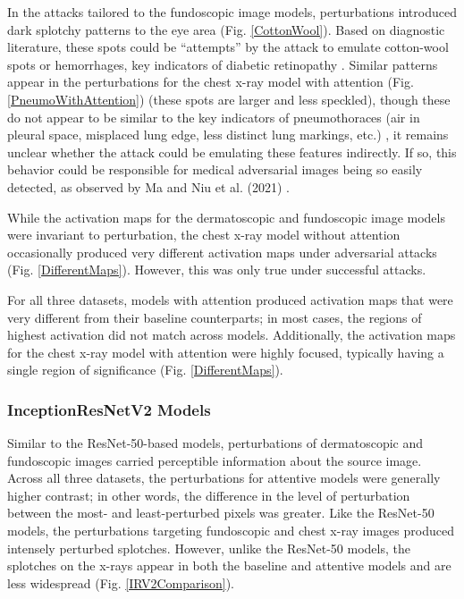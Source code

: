 \documentclass[10pt,twocolumn,letterpaper]{article}
\begin{document}
        
        
        

        In the attacks tailored to the fundoscopic image models, perturbations introduced dark splotchy patterns to the eye area (Fig. \ref{CottonWool}). Based on diagnostic literature, these spots could be ``attempts'' by the attack to emulate cotton-wool spots or hemorrhages, key indicators of diabetic retinopathy \cite{WillsEye}. Similar patterns appear in the perturbations for the chest x-ray model with attention (Fig. \ref{PneumoWithAttention}) (these spots are larger and less speckled), though these do not appear to be similar to the key indicators of pneumothoraces (air in pleural space, misplaced lung edge, less distinct lung markings, etc.) \cite{UnofficialGuide}, it remains unclear whether the attack could be emulating these features indirectly. If so, this behavior could be responsible for medical adversarial images being so easily detected, as observed by Ma and Niu et al. (2021) \cite{MaNiu}.

        

        While the activation maps for the dermatoscopic and fundoscopic image models were invariant to perturbation, the chest x-ray model without attention occasionally produced very different activation maps under adversarial attacks (Fig. \ref{DifferentMaps}). However, this was only true under successful attacks.

        For all three datasets, models with attention produced activation maps that were very different from their baseline counterparts; in most cases, the regions of highest activation did not match across models. Additionally, the activation maps for the chest x-ray model with attention were highly focused, typically having a single region of significance (Fig. \ref{DifferentMaps}).

      \subsubsection{InceptionResNetV2 Models}
        Similar to the ResNet-50-based models, perturbations of dermatoscopic and fundoscopic images carried perceptible information about the source image. Across all three datasets, the perturbations for attentive models were generally higher contrast; in other words, the difference in the level of perturbation between the most- and least-perturbed pixels was greater. Like the ResNet-50 models, the perturbations targeting fundoscopic and chest x-ray images produced intensely perturbed splotches. However, unlike the ResNet-50 models, the splotches on the x-rays appear in both the baseline and attentive models and are less widespread (Fig. \ref{IRV2Comparison}).
\end{document}
